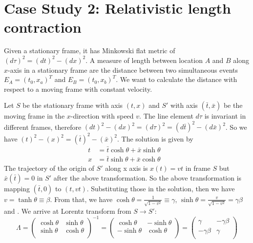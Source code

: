 \documentclass[12pt]{article}
\begin{document}
\section*{Case Study 2: Relativistic length contraction}
Given a stationary frame, it has Minkowski flat metric of $(d\tau)^2 = (dt)^2 - (dx)^2$.
A measure of length between location $A$ and $B$ along $x$-axis in a stationary frame are the distance between two simultaneous events $E_A = (t_0, x_a)^T$ and $E_B = (t_0, x_b)^T$. We want to calculate the distance with respect to a moving frame with constant velocity.

Let $S$ be the stationary frame with axis $(t, x)$ and $S'$ with axis $(\bar{t}, \bar{x})$ be the moving frame in the $x$-direction with speed $v$. The line element $d\tau$ is invariant in different frames, therefore $(dt)^2 - (dx)^2 = (d\tau)^2 = (d\bar{t})^2 - (d\bar{x})^2$. So we have $(t)^2 - (x)^2 = (\bar{t})^2 - (\bar{x})^2$. The solution is given by $$
 \begin{aligned}
 	t &= \bar{t}\cosh \theta + \bar{x} \sinh\theta   & \\
 	x &= \bar{t}\sinh \theta + \bar{x} \cosh\theta   & 
 \end{aligned}
$$
The trajectory of the origin of $S'$ along x axis is $x(t) = vt$ in frame $S$ but $\bar{x}(\bar{t}) = 0$ in $S'$ after the above transformation. So the above transformation is mapping $(\bar{t}, 0)$ to $(t, vt)$. Substituting those in the solution, then we have $v = \tanh\theta \equiv \beta$. From that, we have $\cosh \theta = \frac{1}{\sqrt{1 - v^2}} \equiv \gamma$, $\sinh\theta = \frac{v}{\sqrt{1 - v^2}} = \gamma\beta$ and . We arrive at Lorentz transform from $S \rightarrow S'$: $$\Lambda = \begin{pmatrix}
	\cosh\theta & \sinh\theta \\
	\sinh\theta & \cosh\theta \\ 
\end{pmatrix}^{-1}
= \begin{pmatrix}
	\cosh\theta & - \sinh\theta \\
	-\sinh\theta & \cosh\theta \\ 
\end{pmatrix}
= \begin{pmatrix}
	\gamma & -\gamma\beta \\
	-\gamma \beta & \gamma \\
\end{pmatrix}
$$
\end{document}
